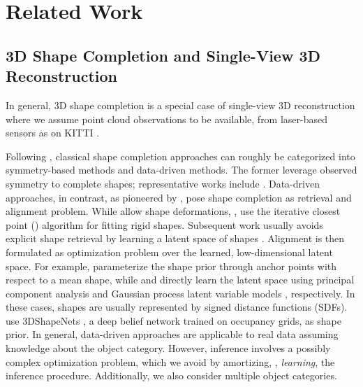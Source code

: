 \section{Related Work}
\label{sec:related-work}

\subsection{3D Shape Completion and Single-View 3D Reconstruction}

In general, 3D shape completion is a special case of single-view 3D reconstruction where we assume point cloud observations to be available, \eg from laser-based sensors as on KITTI \citep{Geiger2012CVPR}.

%
Following \cite{Sung2015TG}, classical shape completion approaches can roughly be categorized into symmetry-based methods and data-driven methods. The former leverage observed symmetry to complete shapes; representative works include \citep{Thrun2005ICCV,Pauly2008TG,Zheng2010TG,Kroemer2012HUMANOIDS,Law2011CVIU}. Data-driven approaches, in contrast, as pioneered by \cite{Pauly2005SGP}, pose shape completion as retrieval and alignment problem. While \cite{Pauly2005SGP} allow shape deformations, \cite{Gupta2015CVPR}, use the iterative closest point (\ICP) algorithm \citep{Besl1992PAMI} for fitting rigid shapes. Subsequent work usually avoids explicit shape retrieval by learning a latent space of shapes \citep{Rock2015CVPR,Haene2014CVPR,Li2015CGF,Engelmann2016GCPR,Nan2012TG,Bao2013CVPR,Dame2013CVPR,Ngyuen2016CVPR}. Alignment is then formulated as optimization problem over the learned, low-dimensional latent space. For example, \cite{Bao2013CVPR} parameterize the shape prior through anchor points with respect to a mean shape, while \cite{Engelmann2016GCPR} and \cite{Dame2013CVPR} directly learn the latent space using principal component analysis and Gaussian process latent variable models \citep{Prisacariu2011CVPR}, respectively. In these cases, shapes are usually represented by signed distance functions (SDFs). \cite{Ngyuen2016CVPR} use 3DShapeNets \citep{Wu2015CVPR}, a deep belief network trained on occupancy grids, as shape prior. In general, data-driven approaches are applicable to real data assuming knowledge about the object category. However, inference involves a possibly complex optimization problem, which we avoid by amortizing, \ie, \emph{learning}, the inference procedure. Additionally, we also consider multiple object categories.

